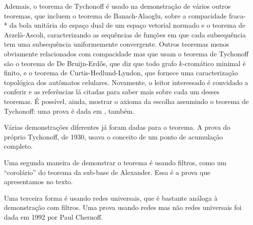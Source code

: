  Ademais, o teorema de Tychonoff é usado na demonstração de vários outros
 teoremas, que incluem o teorema de Banach-Alaoglu, sobre a compacidade
 fraca-* da bola unitária do espaço dual de um espaço vetorial normado
 e o teorema de Arzelà-Ascoli, caracterizando as sequências de funções em
 que cada subsequência tem uma subsequência uniformemente convergente.
 Outros teoremas menos obviamente relacionados com compacidade mas que
 usam o teorema de Tychonoff são o teorema de De Bruijn-Erdős, que diz que
 todo grafo $k$-cromático minimal é finito, e o teorema de
 Curtis-Hedlund-Lyndon, que fornece uma caracterização topológica dos
 autômatos celulares. 
 Novamente, o leitor interessado é convidado a conferir \cite{WikiTychonoff}
 e as referências lá citadas para saber mais sobre cada um desses teoremas.
 É possível, ainda, mostrar o axioma da escolha assumindo o teorema de Tychonoff:
 uma prova é dada em \cite{WikiTychonoff}, também.
 
 Várias demonstrações diferentes já foram dadas para o teorema.
 A prova do próprio Tychonoff, de 1930, usava o conceito de um
 ponto de acumulação completo.
 
 Uma segunda maneira de demonstrar o teorema é usando filtros, 
 como um ``corolário'' do teorema da sub-base de Alexander. 
 Essa é a prova que apresentamos no texto.
 
 Uma terceira forma é usando redes universais, que é bastante análoga à
 demonstração com filtros. 
 Uma prova usando redes mas não redes universais foi dada em 1992 por
 Paul Chernoff.